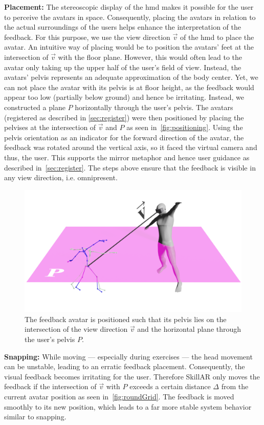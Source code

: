 \textbf{Placement:}
The stereoscopic display of the \acrshort{hmd} makes it possible for the user to perceive the avatars in space. Consequently, placing the avatars in relation to the actual surroundings of the users helps enhance the interpretation of the feedback. For this purpose, we use the view direction $\vec{v}$ of the \acrshort{hmd} to place the avatar. An intuitive way of placing would be to position the avatars' feet at the intersection of $\vec{v}$ with the floor plane. However, this would often lead to the avatar only taking up the upper half of the user's field of view. Instead, the avatars' pelvis represents an adequate approximation of the body center. Yet, we can not place the avatar with its pelvis is at floor height, as the feedback would appear too low (partially below ground) and hence be irritating. Instead, we constructed a plane $P$ horizontally through the user's pelvis. The avatars (registered as described in \autoref{sec:register}) were then positioned by placing the pelvises at the intersection of $\vec{v}$ and $P$ as seen in~\autoref{fig:positioning}. Using the pelvis orientation as an indicator for the forward direction of the avatar, the feedback was rotated around the vertical axis, so it faced the virtual camera and thus, the user. This supports the mirror metaphor and hence user guidance as described in~\autoref{sec:register}. The steps above ensure that the feedback is visible in any view direction, i.e. omnipresent.

\begin{figure}[b!]
	\centering
	\includegraphics[width=0.6\linewidth]{pictures/avatarPos.png}
	\caption[Positioning of the feedback avatar.]{The feedback avatar is positioned such that its pelvis lies on the intersection of the view direction $\vec{v}$ and the horizontal plane through the user's pelvis $P$.\label{fig:positioning}}
\end{figure}

\textbf{Snapping:}
While moving --- especially during exercises --- the head movement can be unstable, leading to an erratic feedback placement. Consequently, the visual feedback becomes irritating for the user. Therefore SkillAR only moves the feedback if the intersection of $\vec{v}$ with $P$ exceeds a certain distance $\Delta$ from the current avatar position as seen in~\autoref{fig:roundGrid}. The feedback is moved smoothly to its new position, which leads to a far more stable system behavior similar to snapping.

